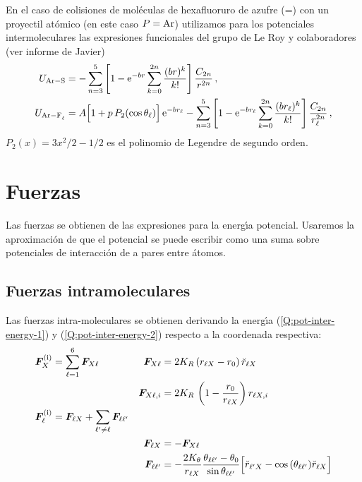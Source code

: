 En el caso de colisiones de mol\'{e}culas de hexafluoruro de azufre (=) con un proyectil at\'{o}mico (en este caso $P=\ce{Ar}$) utilizamos para los potenciales intermoleculares las expresiones funcionales del grupo de Le Roy \autocite{Eichena1988TJCPp2898} y colaboradores (ver informe de Javier)
\begin{subequations}
  \begin{align} \label{Q:pot-inter-energy-1}
    U_{\ce{Ar-S}} &= - \sum_{n=3}^{5} \left[ 1 - \rme^{-br} \sum_{k=0}^{2n}\frac{(br)^{k}}{k!}\right] \frac{C_{2n}}{r^{2n}} \,,    \\
 \label{Q:pot-inter-energy-2}   U_{\ce{Ar-F_{\ell}}} &= A \Big[1 + p\, P_{2}(\cos \theta_{\ell})\Big]\, \rme^{-b r_{\ell}} - \sum_{n=3}^{5} \left[ 1 - \rme^{-br_{\ell}} \sum_{k=0}^{2n}\frac{(br_{\ell})^{k}}{k!}\right] \frac{C_{2n}}{r_{\ell}^{2n}}\,,
  \end{align}
\end{subequations}
$P_{2}(x)= 3 x^{2}/2 -1/2$ es el polinomio de Legendre de segundo orden.


\section{Fuerzas}
\label{S:calculo-fuerzas}
Las fuerzas se obtienen de las expresiones para la energ\'{\i}a potencial. Usaremos la aproximaci\'{o}n de que el potencial se puede escribir como una suma sobre potenciales de interacci\'{o}n de a pares entre \'{a}tomos. 

\subsection{Fuerzas intramoleculares}
Las fuerzas intra-moleculares se obtienen derivando la energ\'{\i}a (\ref{Q:pot-inter-energy-1}) y (\ref{Q:pot-inter-energy-2}) respecto a la coordenada respectiva:
%
\begin{subequations}
  \begin{align}\label{Q:F-sobre-X}
    &  \bm{F}^{\text{(i)}}_{X} = \sum_{\ell=1}^{6}\bm{F}_{X\ell} & \bm{F}_{X\ell} &=  2 K_{R} \, (r_{\ell X}- r_{0})\, \breve{r}_{\ell X}  \\
    & &  \bm{F}_{X\ell,i} &= 2 K_{R} \, \left( 1-\frac{r_{0}}{r_{\ell X}} \right) r_{\ell X,i}  \nonumber\\
    \label{Q:F-Sobre-Fl}
    &\bm{F}^{\text{(i)}}_{\ell} =   \bm{F}_{\ell X} + \sum_{\ell' \ne \ell} \bm{F}_{\ell \ell'} & \\
    &  & \bm{F}_{\ell X} &= -  \bm{F}_{X\ell} \nonumber \\
    & & \bm{F}_{\ell \ell'} &= -\frac{2 K_{\theta}}{r_{\ell X}} \frac{\theta_{\ell\ell'}-\theta_{0}}{\sin \theta_{\ell\ell'}} \Big[ \breve{r}_{\ell' X} - \cos{(\theta_{\ell\ell'})} \breve{r}_{\ell X} \Big] \nonumber
  \end{align}
\end{subequations}


